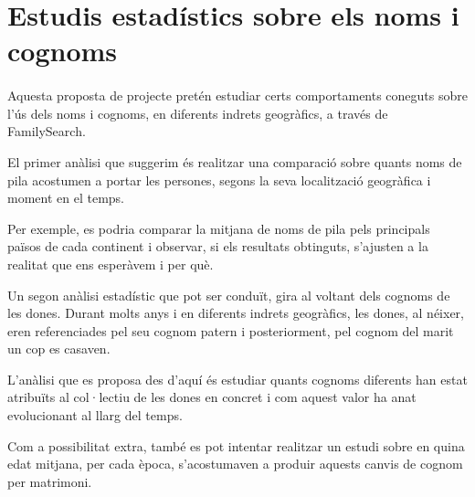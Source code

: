 \section{Estudis estadístics sobre els noms i cognoms}

    \paragraph{}
    Aquesta proposta de projecte pretén estudiar certs comportaments coneguts sobre l'ús dels noms i cognoms, en diferents indrets geogràfics, a través de FamilySearch.

    El primer anàlisi que suggerim és realitzar una comparació sobre quants noms de pila acostumen a portar les persones, segons la seva localització geogràfica i moment en el temps.

    Per exemple, es podria comparar la mitjana de noms de pila pels principals països de cada continent i observar, si els resultats obtinguts, s'ajusten a la realitat que ens esperàvem i per què.

    Un segon anàlisi estadístic que pot ser conduït, gira al voltant dels cognoms de les dones. Durant molts anys i en diferents indrets geogràfics, les dones, al néixer, eren referenciades pel seu cognom patern i posteriorment, pel cognom del marit un cop es casaven.

    L'anàlisi que es proposa des d'aquí és estudiar quants cognoms diferents han estat atribuïts al col·lectiu de les dones en concret i com aquest valor ha anat evolucionant al llarg del temps.

    Com a possibilitat extra, també es pot intentar realitzar un estudi sobre en quina edat mitjana, per cada època, s'acostumaven a produir aquests canvis de cognom per matrimoni.
